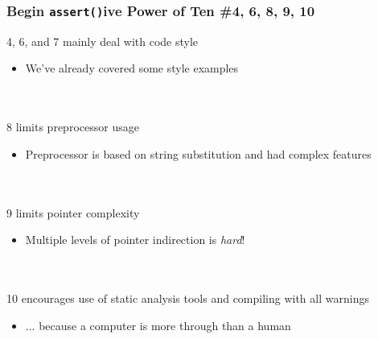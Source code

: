 \documentclass{beamer}
\begin{document}
\begin{frame} [fragile]
\frametitle{Begin \texttt{assert()}ive \small{Power of Ten \#4, 6, 8, 9, 10}}
4, 6, and 7 mainly deal with code style \\
\begin{itemize}
  \item We've already covered some style examples
\end{itemize}
\hfill \\
\hfill \\
8 limits preprocessor usage \\
\begin{itemize}
  \item Preprocessor is based on string substitution and had complex features
\end{itemize}
\hfill \\
\hfill \\
9 limits pointer complexity \\
\begin{itemize}
  \item Multiple levels of pointer indirection is \textit{hard}!
\end{itemize}
\hfill \\
\hfill \\
10 encourages use of static analysis tools and compiling with all warnings \\
\begin{itemize}
  \item ... because a computer is more through than a human
\end{itemize}
\end{frame}
\end{document}
